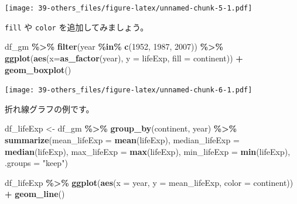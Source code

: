 \documentclass[
  xelatex, ja=standard]{bxjsbook}
\newenvironment{Shaded}{\begin{snugshade}}{\end{snugshade}}
\newcommand{\AttributeTok}[1]{\textcolor[rgb]{0.13,0.29,0.53}{#1}}
\newcommand{\DecValTok}[1]{\textcolor[rgb]{0.00,0.00,0.81}{#1}}
\newcommand{\FunctionTok}[1]{\textcolor[rgb]{0.13,0.29,0.53}{\textbf{#1}}}
\newcommand{\NormalTok}[1]{#1}
\newcommand{\OtherTok}[1]{\textcolor[rgb]{0.56,0.35,0.01}{#1}}
\newcommand{\SpecialCharTok}[1]{\textcolor[rgb]{0.81,0.36,0.00}{\textbf{#1}}}
\newcommand{\StringTok}[1]{\textcolor[rgb]{0.31,0.60,0.02}{#1}}
\theoremstyle{definition}
\theoremstyle{definition}
\theoremstyle{definition}
\theoremstyle{definition}
\theoremstyle{remark}
\begin{document}
\texttt{[image: 39-others\_files/figure-latex/unnamed-chunk-5-1.pdf]}

\texttt{fill} や \texttt{color} を追加してみましょう。

\begin{Shaded}
\begin{Highlighting}[]
\NormalTok{df\_gm }\SpecialCharTok{\%\textgreater{}\%} \FunctionTok{filter}\NormalTok{(year }\SpecialCharTok{\%in\%} \FunctionTok{c}\NormalTok{(}\DecValTok{1952}\NormalTok{, }\DecValTok{1987}\NormalTok{, }\DecValTok{2007}\NormalTok{)) }\SpecialCharTok{\%\textgreater{}\%}
  \FunctionTok{ggplot}\NormalTok{(}\FunctionTok{aes}\NormalTok{(}\AttributeTok{x=}\FunctionTok{as\_factor}\NormalTok{(year), }\AttributeTok{y =}\NormalTok{ lifeExp, }\AttributeTok{fill =}\NormalTok{ continent)) }\SpecialCharTok{+}
  \FunctionTok{geom\_boxplot}\NormalTok{()}
\end{Highlighting}
\end{Shaded}

\texttt{[image: 39-others\_files/figure-latex/unnamed-chunk-6-1.pdf]}

折れ線グラフの例です。

\begin{Shaded}
\begin{Highlighting}[]
\NormalTok{df\_lifeExp }\OtherTok{\textless{}{-}}\NormalTok{ df\_gm }\SpecialCharTok{\%\textgreater{}\%} 
  \FunctionTok{group\_by}\NormalTok{(continent, year) }\SpecialCharTok{\%\textgreater{}\%} 
  \FunctionTok{summarize}\NormalTok{(}\AttributeTok{mean\_lifeExp =} \FunctionTok{mean}\NormalTok{(lifeExp), }\AttributeTok{median\_lifeExp =} \FunctionTok{median}\NormalTok{(lifeExp), }\AttributeTok{max\_lifeExp =} \FunctionTok{max}\NormalTok{(lifeExp), }\AttributeTok{min\_lifeExp =} \FunctionTok{min}\NormalTok{(lifeExp), }\AttributeTok{.groups =} \StringTok{"keep"}\NormalTok{)}
\end{Highlighting}
\end{Shaded}

\begin{Shaded}
\begin{Highlighting}[]
\NormalTok{df\_lifeExp }\SpecialCharTok{\%\textgreater{}\%} \FunctionTok{ggplot}\NormalTok{(}\FunctionTok{aes}\NormalTok{(}\AttributeTok{x =}\NormalTok{ year, }\AttributeTok{y =}\NormalTok{ mean\_lifeExp, }\AttributeTok{color =}\NormalTok{ continent)) }\SpecialCharTok{+}
  \FunctionTok{geom\_line}\NormalTok{()}
\end{Highlighting}
\end{Shaded}
\end{document}
